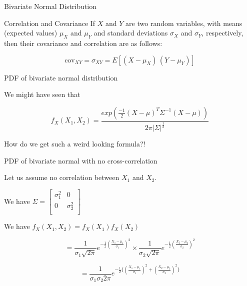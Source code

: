 \documentclass{beamer}
\begin{document}
\begin{frame}{Bivariate Normal Distribution}
	
	
	
	
	
	
	
	
\end{frame}

\begin{frame}{Correlation and Covariance}
If $X$ and $Y$ are two random variables, with means (expected values) $\mu_X$ and $\mu_Y$ and standard deviations $\sigma_X$ and $\sigma_Y$, respectively, then their covariance and correlation are as follows:

$$\text{cov}_{XY} = \sigma_{XY} = E[(X-\mu_X)\,(Y-\mu_Y)] $$

\end{frame}

\begin{frame}{PDF of bivariate normal distribution}

We might have seen that 

$$f_X(X_1, X_2) = \frac{exp(\frac{-1}{2}(X-\mu)^T \Sigma^{-1}(X-\mu))}{2\pi |\Sigma|^\frac{1}{2}}$$

How do we get such a weird looking formula?!

\end{frame}

\begin{frame}{PDF of bivariate normal with no cross-correlation}

Let us assume no correlation between $X_1$ and $X_2$.

We have $\Sigma = \begin{bmatrix}
\sigma_1^2 & 0 \\
0 & \sigma_2^2 \\
\end{bmatrix}$

We have $f_X(X_1, X_2) = f_X(X_1)f_X(X_2)$

$$=\frac{1}{\sigma_1 \sqrt{2\pi} } e^{-\frac{1}{2}\left(\frac{X_1-\mu_1}{\sigma_1}\right)^2} \times \frac{1}{\sigma_2 \sqrt{2\pi} } e^{-\frac{1}{2}\left(\frac{X_2-\mu_2}{\sigma_2}\right)^2}$$

$$= \frac{1}{\sigma_1 \sigma_2 2\pi } e^{-\frac{1}{2}\{\left(\frac{X_1-\mu_1}{\sigma_1}\right)^2 + \left(\frac{X_2-\mu_2}{\sigma_2}\right)^2 \}}  $$
\end{frame}
\end{document}
